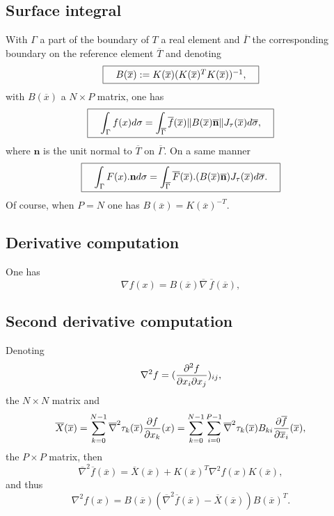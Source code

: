 \documentclass[11pt,a4paper]{article}
\begin{document}
\subsection{Surface integral}
With $\Gamma$ a part of the boundary of $T$ a real element and $\overline{\Gamma}$ the corresponding boundary on the reference element $\overline{T}$ and denoting
$$ \fbox{$\hspace{1em} B(\overline{x}) := K(\overline{x})(K(\overline{x})^T K(\overline{x}))^{-1},\hspace{1em}$} $$
with $B(\overline{x})$ a $N \times P$ matrix, one has
$$ \fbox{$\hspace{1em} \displaystyle \int_{\Gamma} f(x) d\sigma = \int_{\overline{\Gamma}} \overline{f}(\overline{x}) \|B(\overline{x})\overline{\mathbf n}\| J_{\tau}(\overline{x}) d\overline{\sigma},\hspace{1em}$} $$
where ${\mathbf n}$ is the unit normal to $\overline{T}$ on $\overline{\Gamma}$. On a same manner
$$ \fbox{$\hspace{1em} \displaystyle \int_{\Gamma} F(x).{\mathbf n} d\sigma = \int_{\overline{\Gamma}} \overline{F}(\overline{x}).(B(\overline{x})\overline{\mathbf n}) J_{\tau}(\overline{x}) d\overline{\sigma}.\hspace{1em}$} $$
Of course, when $P = N$ one has $B(\overline{x}) = K(\overline{x})^{-T}$.

\subsection{Derivative computation}
One has
$$ \nabla f(x) = B(\overline{x}) \overline{\nabla}\,\overline{f}(\overline{x}), $$
\subsection{Second derivative computation}
Denoting 
$$ \nabla^2 f = ({{\displaystyle \frac{\displaystyle \partial^2 f}{\displaystyle \partial x_i \partial x_j}}})_{ij}, $$
the $N \times N$ matrix and
$$ \overline{X}(\overline{x}) = \sum_{k = 0}^{N-1} \overline{\nabla}^2 \tau_k(\overline{x}) {\displaystyle \frac{\displaystyle \partial f}{\displaystyle \partial x_k}}(x) = \sum_{k = 0}^{N-1} \sum_{i = 0}^{P-1} \overline{\nabla}^2 \tau_k(\overline{x}) B_{ki} {\displaystyle \frac{\displaystyle \partial \overline{f}}{\displaystyle \partial \overline{x}_i}}(\overline{x}), $$
the $P \times P$ matrix, then
$$ \overline{\nabla}^2 \overline{f}(\overline{x}) = \overline{X}(\overline{x}) + K(\overline{x})^T \nabla^2 f(x) K(\overline{x}), $$
and thus
$$ \nabla^2 f(x) = B(\overline{x}) (\overline{\nabla}^2 \overline{f}(\overline{x}) - \overline{X}(\overline{x})) B(\overline{x})^T. $$
\end{document}
